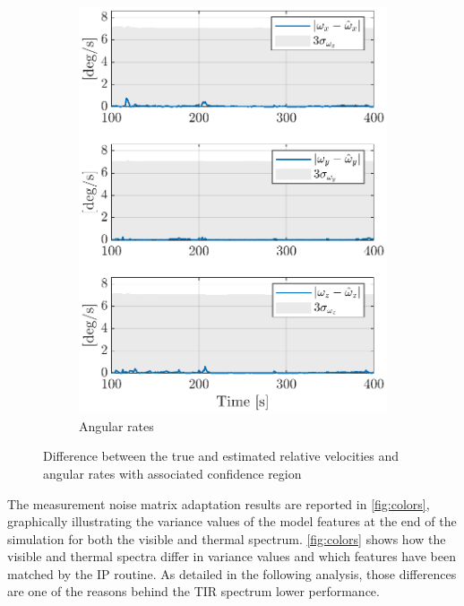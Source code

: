 \begin{figure}[!h]
\begin{subfigure}[b]{0.48\textwidth}
    \includegraphics[clip,trim = 0cm 0cm 0cm 0cm,width=\linewidth]{Images/sigma_rate.eps}
    \caption{Angular rates}
    \label{fig:sigmarate}
    \end{subfigure}
    \caption{Difference between the true and estimated relative velocities and angular rates with associated confidence region}
    \label{fig:sigmavelrate}
\end{figure}
The measurement noise matrix adaptation results are reported in \cref{fig:colors}, graphically illustrating the variance values of the model features at the end of the simulation for both the visible and thermal spectrum. \cref{fig:colors} shows how the visible and thermal spectra differ in variance values and which features have been matched by the IP routine. As detailed in the following analysis, those differences are one of the reasons behind the TIR spectrum lower performance. \\


